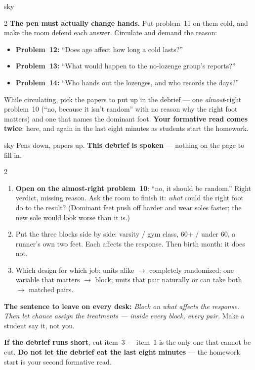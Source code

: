 \documentclass[10pt]{article}
\begin{document}
\begin{skillbox}{sky}
\begin{multicols}{2}
\textbf{The pen must actually change hands.} Put problem~11 on them cold, and make the room
defend each answer. Circulate and demand the reason:
\begin{itemize}[leftmargin=1.1em, nosep]
  \item \textbf{Problem~12:} ``Does age affect how long a cold lasts?''
  \item \textbf{Problem~13:} ``What would happen to the no-lozenge group's reports?''
  \item \textbf{Problem~14:} ``Who hands out the lozenges, and who records the days?''
\end{itemize}
While circulating, pick the papers to put up in the debrief --- one \emph{almost}-right
problem~10 (``no, because it isn't random'' with no reason why the right foot matters) and
one that names the dominant foot. \textbf{Your formative read comes twice}: here, and again
in the last eight minutes as students start the homework.
\end{multicols}
\end{skillbox}

\boxguard
\begin{skillbox}{sky}
Pens down, papers up. \textbf{This debrief is spoken} --- nothing on the page to fill in.
\begin{multicols}{2}
\begin{enumerate}[leftmargin=1.3em, itemsep=3pt]
  \item \textbf{Open on the almost-right problem~10}: ``no, it should be random.'' Right
        verdict, missing reason. Ask the room to finish it: \emph{what} could the right foot
        do to the result? (Dominant feet push off harder and wear soles faster; the new sole
        would look worse than it is.)
  \item Put the three blocks side by side: varsity / gym class, 60+ / under 60, a runner's own
        two feet. Each affects the response. Then birth month: it does not.
  \item Which design for which job: units alike $\to$ completely randomized; one variable
        that matters $\to$ block; units that pair naturally or can take both $\to$ matched
        pairs.
\end{enumerate}
\columnbreak
\textbf{The sentence to leave on every desk:} \emph{Block on what affects the response. Then
let chance assign the treatments --- inside every block, every pair.} Make a student say it,
not you.

\textbf{If the debrief runs short}, cut item~3 --- item~1 is the only one that cannot be cut.
\textbf{Do not let the debrief eat the last eight minutes} --- the homework start is your
second formative read.
\end{multicols}
\end{skillbox}
\end{document}

